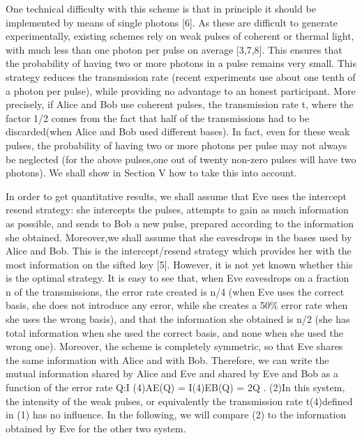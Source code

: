 One technical difficulty with this scheme is that in principle it should be implemented by means of single photons [6]. As these are difficult to generate experimentally, existing schemes rely on weak pulses of coherent or thermal light, with much less than one photon per pulse on average [3,7,8]. This ensures that the probability of having two or more photons in a pulse remains very small. This strategy reduces the transmission rate (recent experiments use about one tenth of a photon per pulse), while providing no advantage to an honest participant. More precisely, if Alice and Bob use coherent pulses, the transmission rate t, where the factor 1/2 comes from the fact that half of the transmissions had to be discarded(when Alice and Bob used different bases). In fact, even for these weak pulses, the probability of having two or more photons per pulse may not always be neglected (for the above pulses,one out of twenty non-zero pulses will have two photons). We shall show in Section V how to take this into account.

In order to get quantitative results, we shall assume that Eve uses the intercept resend strategy: she intercepts the pulses, attempts to gain as much information as possible, and sends to Bob a new pulse, prepared according to the information she obtained. Moreover,we shall assume that she eavesdrops in the bases used by Alice and Bob. This is the intercept/resend strategy which provides her with the most information on the sifted key [5]. However, it is not yet known whether this is the optimal strategy. It is easy to see that, when Eve eavesdrops on a fraction n of the transmissions, the error rate created is n/4 (when Eve uses the correct basis, she does not introduce any error, while she creates a 50\% error rate when she uses the wrong basis), and that the information she obtained is n/2 (she has total information when she used the correct basis, and none when she used the wrong one). Moreover, the scheme is completely symmetric, so that Eve shares the same information with Alice and with Bob. Therefore, we can write the mutual information shared by Alice and Eve and shared by Eve and Bob as a function of the error rate Q:I
(4)AE(Q) = I(4)EB(Q) = 2Q . (2)In this system, the intensity of the weak pulses, or equivalently the transmission rate t(4)defined in (1) has no influence. In the following, we will compare (2) to the information obtained by Eve for the other two system.

